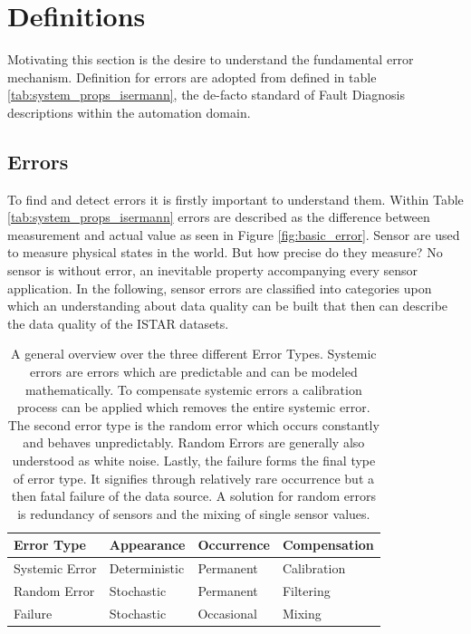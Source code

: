 \newpage


\section{Definitions}
Motivating this section is the desire to understand the fundamental error mechanism. Definition for errors are adopted from \textcite{isermann_fault-diagnosis_2006} defined in table \ref{tab:system_props_isermann}, the de-facto standard of Fault Diagnosis descriptions within the automation domain.

\subsection{Errors}

To find and detect errors it is firstly important to understand them. Within Table \ref{tab:system_props_isermann} errors are described as the difference between measurement and actual value as seen in Figure \ref{fig:basic_error}. Sensor are used to measure physical states in the world. But how precise do they measure? No sensor is without error, an inevitable property accompanying every sensor application. In the following, sensor errors are classified into categories upon which an understanding about data quality can be built that then can describe the data quality of the ISTAR datasets.
\begin{table}[h]
    \centering
    \caption[Error Type Overview]{A general overview over the three different Error Types. Systemic errors are errors which are predictable and can be modeled mathematically. To compensate systemic errors a calibration process can be applied which removes the entire systemic error. The second error type is the random error which occurs constantly and behaves unpredictably. Random Errors are generally also understood as white noise. Lastly, the failure forms the final type of error type. It signifies through relatively rare occurrence but a then fatal failure of the data source. A solution for random errors is redundancy of sensors and the mixing of single sensor values.  \cite{hartmann_navigation-sensordatenfusion_2022}}
    \begin{tabular}{@{}llll@{}}
        \toprule
        Error Type     & Appearance    & Occurrence & Compensation \\ \midrule
        Systemic Error & Deterministic & Permanent  & Calibration  \\
        Random Error   & Stochastic    & Permanent  & Filtering    \\
        Failure        & Stochastic    & Occasional & Mixing       \\ \bottomrule
    \end{tabular}
    \label{tab:error_types}
\end{table}


